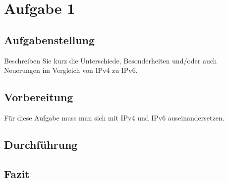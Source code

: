 \newpage

\section{Aufgabe 1}

\subsection{Aufgabenstellung}
Beschreiben Sie kurz die Unterschiede, Besonderheiten und/oder auch Neuerungen im Vergleich von IPv4 zu IPv6.

\subsection{Vorbereitung}
Für diese Aufgabe muss man sich mit IPv4 und IPv6 auseinandersetzen.

\subsection{Durchführung}

\subsection{Fazit}